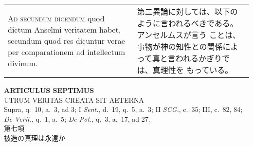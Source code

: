 \documentclass[10pt]{jsarticle} %
\begin{document}
\begin{longtable}{p{21em}p{21em}}
\\

{\scshape Ad secundum dicendum} quod dictum Anselmi veritatem habet,
secundum quod res dicuntur verae per comparationem ad intellectum
divinum.


&

第二異論に対しては、以下のように言われるべきである。アンセルムスが言う
ことは、事物が神の知性との関係によって真と言われるかぎりでは、真理性を
もっている。

\\


\end{longtable}
\newpage

\begin{center}
 {\Large {\bf ARTICULUS SEPTIMUS}}\\
 {\large UTRUM VERITAS CREATA SIT AETERNA}\\
 {\footnotesize Supra, q.~10, a.~3, ad 3; I {\itshape Sent.}, d.~19,
 q.~5, a.~3; II {\itshape SCG.}, c.~35; III, c.~82, 84; {\itshape De
 Verit.}, q.~1, a.~5; {\itshape De Pot.}, q.~3, a.~17, ad 27.}\\
 {\Large 第七項\\被造の真理は永遠か}
\end{center}
\end{document}
